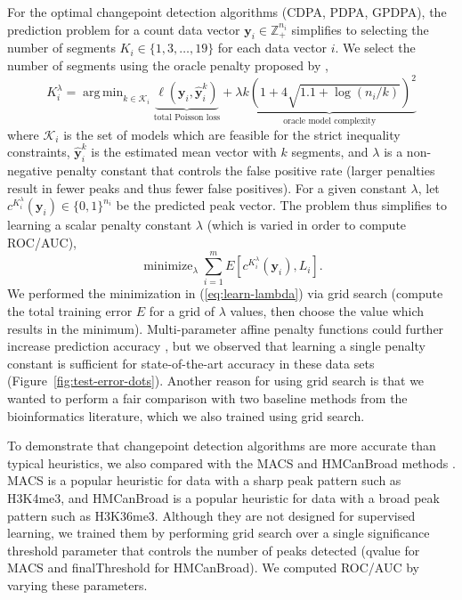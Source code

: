 \documentclass[twoside,11pt]{article}
\DeclareMathOperator*{\argmin}{arg\,min}
\DeclareMathOperator*{\minimize}{minimize}
\newcommand{\ZZ}{\mathbb Z}
\begin{document}
For the optimal changepoint detection algorithms (CDPA, PDPA, GPDPA),
the prediction problem for a count data vector
$\mathbf y_i\in\ZZ_+^{n_i}$ simplifies to selecting the number of
segments $K_i\in \{1, 3,\dots, 19\}$ for each data vector $i$.
We select the number of segments
using the oracle penalty proposed by \citet{cleynen2013segmentation},
\begin{equation}
  K_i^\lambda=\argmin_{k\in \mathcal K_i} \underbrace{\ell(\mathbf y_i, \mathbf{\hat y}^k_i)}_{\text{total Poisson loss}} 
+ \lambda 
\underbrace{
k\left(
1 + 4\sqrt{1.1 + \log( n_i/k)}
\right)^2
}_{\text{
oracle model complexity
}}
\end{equation}
where $\mathcal K_i$ is the set of models which are feasible for the
strict inequality constraints, $\mathbf{\hat y}^k_i$ is the estimated
mean vector with $k$ segments, and $\lambda$ is a non-negative penalty
constant that controls the false positive rate (larger penalties
result in fewer peaks and thus fewer false positives). For a given
constant $\lambda$, let $c^{K_i^\lambda}(\mathbf y_i)\in\{0,1\}^{n_i}$
be the predicted peak vector. The problem thus simplifies to learning
a scalar penalty constant $\lambda$ (which is varied in order to
compute ROC/AUC),
\begin{equation}
  \label{eq:learn-lambda}
  \minimize_{\lambda}
  \sum_{i=1}^m E\left[
    c^{K_i^\lambda}(\mathbf y_i), 
    L_i\right].
\end{equation}
We performed the minimization in
(\ref{eq:learn-lambda}) via grid search (compute the total training error $E$
for a grid of $\lambda$ values, then choose the value which results in
the minimum). Multi-parameter affine penalty functions could further
increase prediction accuracy \citep{HOCKING-penalties}, but we
observed that learning a single penalty constant is sufficient for
state-of-the-art accuracy in these data sets
(Figure~\ref{fig:test-error-dots}). Another reason for using grid
search is that we wanted to perform a fair comparison with two
baseline methods from the bioinformatics literature, which we also
trained using grid search.

To demonstrate that changepoint detection algorithms are more accurate
than typical heuristics, we also
compared with the MACS and HMCanBroad methods \citep{MACS,
  HMCan}. MACS is a popular heuristic for data with a sharp peak
pattern such as H3K4me3, and \mbox{HMCanBroad} is a popular heuristic
for data with a broad peak pattern such as H3K36me3. Although they are
not designed for supervised learning, we trained them by performing
grid search over a single significance threshold parameter that
controls the number of peaks detected (qvalue for MACS and
finalThreshold for HMCanBroad). We computed ROC/AUC by varying these
parameters.
\end{document}
